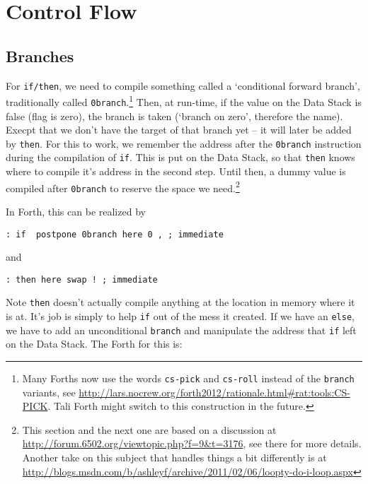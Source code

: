 \section{Control Flow} 

\subsection{Branches} 

For \texttt{if/then}, we need to compile something called a `conditional forward
branch', traditionally called \texttt{0branch}.\footnote{Many Forths now use the
words \texttt{cs-pick} and \texttt{cs-roll} instead of the \texttt{branch}
variants, see
\href{http://lars.nocrew.org/forth2012/rationale.html\#rat:tools:CS-PICK}
{http://lars.nocrew.org/forth2012/rationale.html\#rat:tools:CS-PICK}. Tali Forth
might switch to this construction in the future.} Then, at run-time, if the
value on the Data Stack is false (flag is zero), the branch is taken (`branch on
zero', therefore the name). Execpt that we don't have the target of that branch
yet -- it will later be added by \texttt{then}. For this to work, we remember
the address after the \texttt{0branch} instruction during the compilation of
\texttt{if}. This is put on the Data Stack, so that \texttt{then} knows where to
compile it's address in the second step. Until then, a dummy value is compiled
after \texttt{0branch} to reserve the space we need.\footnote{This section and
the next one are based on a discussion at
\href{http://forum.6502.org/viewtopic.php?f=9\&t=3176}
{http://forum.6502.org/viewtopic.php?f=9\&t=3176}, see there for more details.
Another take on this subject that handles things a bit differently is at
\href{http://blogs.msdn.com/b/ashleyf/archive/2011/02/06/loopty-do-i-loop.aspx}{http://blogs.msdn.com/b/ashleyf/archive/2011/02/06/loopty-do-i-loop.aspx}
}

In Forth, this can be realized by

\begin{lstlisting}[frame=lines]
        : if  postpone 0branch here 0 , ; immediate
\end{lstlisting}

\noindent and 

\begin{lstlisting}[frame=lines]
        : then here swap ! ; immediate
\end{lstlisting}

\noindent Note \texttt{then} doesn't actually compile anything at the location in memory
where it is at. It's job is simply to help \texttt{if} out of the mess it
created.  If we have an \texttt{else}, we have to add an unconditional
\texttt{branch} and manipulate the address that \texttt{if} left on the Data
Stack. The Forth for this is: 

